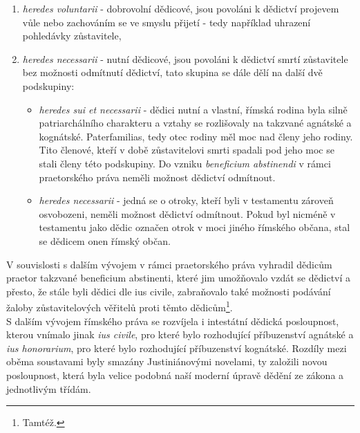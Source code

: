 \documentclass{article}
\begin{document}
\begin{enumerate}
\item \textit{heredes voluntarii} - dobrovolní dědicové, jsou povoláni k dědictví projevem vůle nebo zachováním se ve smyslu přijetí - tedy například uhrazení pohledávky zůstavitele,
\item \textit{heredes necessarii} - nutní dědicové, jsou povoláni k dědictví smrtí zůstav\-itele bez možnosti odmítnutí dědictví, tato skupina se dále dělí na další dvě podskupiny:
\begin{itemize}
\item \textit{heredes sui et necessarii} - dědici nutní a vlastní, římská rodina byla silně patriarchálního charakteru a vztahy se rozlišovaly na takzvané agnátské a kognátské. Paterfamilias, tedy otec rodiny měl moc nad členy jeho rodiny. Tito členové, kteří v době zůstavitelovi smrti spadali pod jeho moc se stali členy této podskupiny. Do vzniku \textit{beneficium abstinendi} v rámci praetorského práva neměli možnost dědictví odmítnout.
\item \textit{heredes necessarii} - jedná se o otroky, kteří byli v testamentu zároveň osvobozeni, neměli možnost dědictví odmítnout. Pokud byl nicméně v testamentu jako dědic označen otrok v moci jiného římského občana, stal se dědicem onen římský občan.
\end{itemize}
\end{enumerate}

\vspace{5 mm}



V souvislosti s dalším vývojem v rámci praetorského práva vyhradil dědicům praetor takzvané beneficium abstinenti, které jim umožňovalo vzdát se dědictví a přesto, že stále byli dědici dle ius civile, zabraňovalo také možnosti podávání žaloby zůstavitelových věřitelů proti těmto dědicům\footnote{Tamtéž.}.\\

S dalším vývojem římského práva se rozvíjela i intestátní dědická posloupnost, kterou vnímalo jinak \textit{ius civile}, pro které bylo rozhodující příbuzenství agnátské a \textit{ius honorarium}, pro které bylo rozhodující příbuzenství kognátské. Rozdíly mezi oběma soustavami byly smazány Justiniánovými novelami, ty založili novou posloupnost, která byla velice podobná naší moderní úpravě dědění ze zákona a jednotlivým třídám.\\
\end{document}
